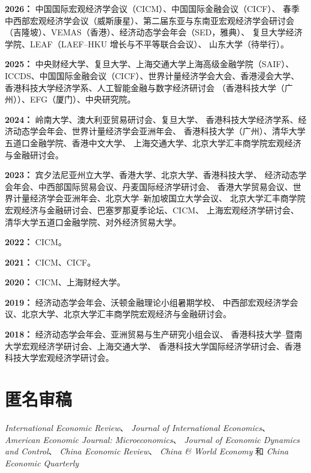 \documentclass[11pt]{res}
\newcommand{\yearskip}{\par\vspace{0.08in}}
\begin{document}
\begin{resume}
\hspace{-0.42in}\begin{minipage}{\linewidth}
\textbf{2026：} 中国国际宏观经济学会议（CICM）、中国国际金融会议（CICF）、
春季中西部宏观经济学会议（威斯康星）、第二届东亚与东南亚宏观经济学会研讨会
（吉隆坡）、VEMAS（香港）、经济动态学会年会（SED，雅典）、
复旦大学经济学院、LEAF（LAEF--HKU 增长与不平等联合会议）、
山东大学（待举行）。
\yearskip

\textbf{2025：} 中央财经大学、复旦大学、上海交通大学上海高级金融学院（SAIF）、
ICCDS、中国国际金融会议（CICF）、世界计量经济学会大会、香港浸会大学、
香港科技大学经济学系、人工智能金融与数字经济研讨会
（香港科技大学（广州））、EFG（厦门）、中央研究院。
\yearskip

\textbf{2024：} 岭南大学、澳大利亚贸易研讨会、复旦大学、
香港科技大学经济学系、经济动态学会年会、世界计量经济学会亚洲年会、
香港科技大学（广州）、清华大学五道口金融学院、香港中文大学、
上海交通大学、北京大学汇丰商学院宏观经济与金融研讨会。
\yearskip

\textbf{2023：} 宾夕法尼亚州立大学、香港大学、北京大学、香港科技大学、
经济动态学会年会、中西部国际贸易会议、丹麦国际经济学研讨会、
香港大学贸易会议、世界计量经济学会亚洲年会、北京大学--新加坡国立大学会议、
北京大学汇丰商学院宏观经济与金融研讨会、巴塞罗那夏季论坛、CICM、
上海宏观经济学研讨会、清华大学五道口金融学院、对外经济贸易大学。
\yearskip

\textbf{2022：} CICM。
\yearskip

\textbf{2021：} CICM、CICF。
\yearskip

\textbf{2020：} CICM、上海财经大学。
\yearskip

\textbf{2019：} 经济动态学会年会、沃顿金融理论小组暑期学校、
中西部宏观经济学会议、北京大学、北京大学汇丰商学院宏观经济与金融研讨会。
\yearskip

\textbf{2018：} 经济动态学会年会、亚洲贸易与生产研究小组会议、
香港科技大学--暨南大学宏观经济学研讨会、上海交通大学、
香港科技大学国际经济学研讨会、香港科技大学宏观经济学研讨会。
\end{minipage}

\section{\bf 匿名审稿}
\vspace{0.1in}
\hspace{-0.42in}\begin{minipage}{\linewidth}
\textit{International Economic Review}、
\textit{Journal of International Economics}、
\textit{American Economic Journal: Microeconomics}、
\textit{Journal of Economic Dynamics and Control}、
\textit{China Economic Review}、
\textit{China \& World Economy} 和
\textit{China Economic Quarterly}
\end{minipage}


\end{resume}
\end{document}
